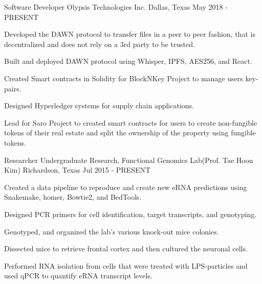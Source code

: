 

\begin{cventries}

	\cventry
	{Software Developer} %
	{Olypsis Technologies Inc.} %
	{Dallas, Texas} %
	{May 2018 - PRESENT} %
	{
		\begin{cvitems} %
			\item {Developed the DAWN protocol to transfer files in a peer to peer fashion, that is decentralized and does not rely on a 3rd party to be trusted.}
			\item {Built and deployed DAWN protocol using Whisper, IPFS, AES256, and React.}
			\item {Created Smart contracts in Solidity for BlockNKey Project to manage users key-pairs.}
			\item {Designed Hyperledger systems for supply chain applications.}
			\item {Lead for Saro Project to created smart contracts for users to create non-fungible tokens of their real estate and split the ownership of the property using fungible tokens.}
		\end{cvitems}
	}

	\cventry
	{Researcher} %
	{Undergraduate Research, Functional Genomics Lab(Prof. Tae Hoon Kim)} %
	{Richardson, Texas} %
	{Jul 2015 - PRESENT} %
	{
		\begin{cvitems} %
			\item {Created a data pipeline to reproduce and create new eRNA predictions using Snakemake, homer, Bowtie2, and BedTools.}
			\item {Designed PCR primers for cell identification, target transcripts, and genotyping.}
			\item {Genotyped, and organized the lab's various knock-out mice colonies.}
			\item {Dissected mice to retrieve frontal cortex and then cultured the neuronal cells.}
			\item {Performed RNA isolation from cells that were treated with LPS-particles and used qPCR to quantify eRNA transcript levels.}
		\end{cvitems}
	}


\end{cventries}
